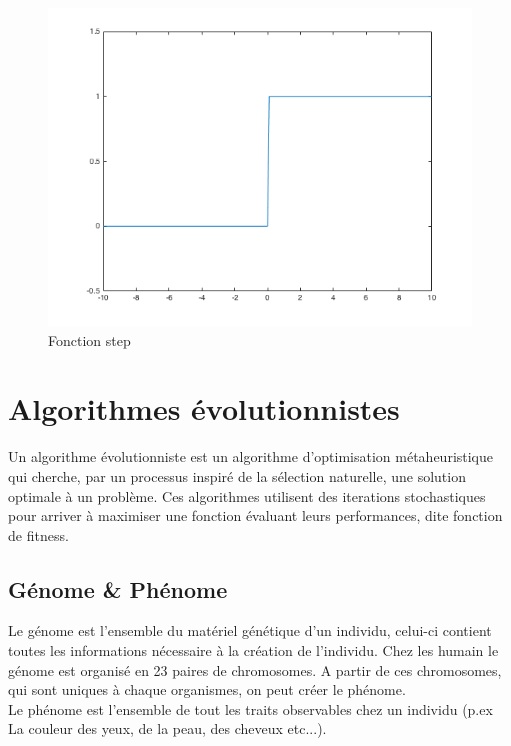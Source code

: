 \documentclass{article}
\begin{document}
\begin{figure}[H]
\begin{center}
	\includegraphics[scale=0.4]{step.png} 
	\caption{Fonction step}
\end{center}
\end{figure}

\newpage
\section{Algorithmes évolutionnistes}

Un algorithme évolutionniste est un algorithme d'optimisation métaheuristique qui cherche, par un processus inspiré de la sélection naturelle, une solution optimale à un problème. Ces algorithmes utilisent des iterations stochastiques pour arriver à maximiser une fonction évaluant leurs performances, dite fonction de fitness.\cite{wikiea}\\

\subsection{Génome \& Phénome}

Le génome est l'ensemble du matériel génétique d'un individu, celui-ci contient toutes les informations nécessaire à la création de l'individu.\cite{wikigenome} Chez les humain le génome est organisé en 23 paires de chromosomes. A partir de ces chromosomes, qui sont uniques à chaque organismes, on peut créer le phénome.\\
Le phénome est l'ensemble de tout les traits observables chez un individu (p.ex La couleur des yeux, de la peau, des cheveux etc...).\cite{wikiphenome}\\
\end{document}
